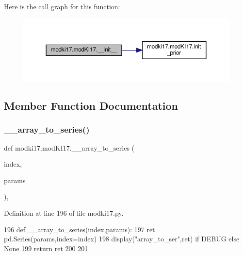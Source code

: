 Here is the call graph for this function\+:\nopagebreak
\begin{figure}[H]
\begin{center}
\leavevmode
\includegraphics[width=350pt]{df/da3/classmodki17_1_1modKI17_a2514450fa8938c601d942fb15af934d4_cgraph}
\end{center}
\end{figure}


\subsection{Member Function Documentation}
\mbox{\label{classmodki17_1_1modKI17_a2696f15483913b4d08f5e8a9efb47330}} 
\subsubsection{\texorpdfstring{\+\_\+\+\_\+array\+\_\+to\+\_\+series()}{\_\_array\_to\_series()}}
{\footnotesize\ttfamily def modki17.\+mod\+K\+I17.\+\_\+\+\_\+array\+\_\+to\+\_\+series (\begin{DoxyParamCaption}\item[{}]{index,  }\item[{}]{params }\end{DoxyParamCaption})\hspace{0.3cm}{\ttfamily [static]}, {\ttfamily [private]}}



Definition at line 196 of file modki17.\+py.


\begin{DoxyCode}
196     \textcolor{keyword}{def }\_\_array\_to\_series(index,params):
197         ret = pd.Series(params,index=index)
198         display(\textcolor{stringliteral}{"array\_to\_ser"},ret) \textcolor{keywordflow}{if} DEBUG \textcolor{keywordflow}{else} \textcolor{keywordtype}{None}
199         \textcolor{keywordflow}{return} ret
200     
201     
\end{DoxyCode}
\mbox{\label{classmodki17_1_1modKI17_a0ec91778c40f8911c85e1af7459516d8}} 
